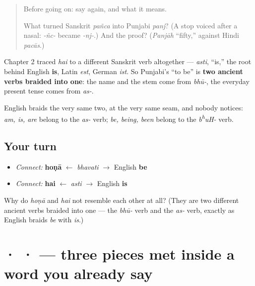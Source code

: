 \label{lesson:PA-C07-hona-two-roots}



\begin{quote}
Before going on: say \textbf{} again, and what it means.

What turned Sanskrit \emph{pañca} into Punjabi \emph{panj}? (A stop voiced after a nasal: \emph{-ñc-} became \emph{-nj-}.) And the proof? (\emph{Panjāh} \textquotedblleft{}fifty,\textquotedblright{} against Hindi \emph{pacās}.)
\end{quote}

\begin{grammarlens}[title={Grammar Lens: one verb, two roots}]
Chapter 2 traced \textbf{} \emph{hai} to a different Sanskrit verb altogether — \emph{asti}, “is,” the root behind English \textbf{is}, Latin \emph{est}, German \emph{ist}. So Punjabi's “to be” is \textbf{two ancient verbs braided into one}: the name and the stem come from \emph{bhū-}, the everyday present tense comes from \emph{as-}.

English braids the very same two, at the very same seam, and nobody notices: \emph{am, is, are} belong to the \emph{as-} verb; \emph{be, being, been} belong to the \emph{b\textsuperscript{h}uH-} verb.
\end{grammarlens}

\subsection*{Your turn}
\begin{itemize}
\raggedright
  \item \emph{Connect:} \textbf{hoṇā} $\leftarrow$ \emph{bhavati} $\to$ English \textbf{be}
  \item \emph{Connect:} \textbf{hai} $\leftarrow$ \emph{asti} $\to$ English \textbf{is}
\end{itemize}

\begin{tcolorbox}[breakable,colback=teal!4,colframe=teal!35!black,title={Before you move on}]
Why do \emph{hoṇā} and \emph{hai} not resemble each other at all? (They are two different ancient verbs braided into one — the \emph{bhū-} verb and the \emph{as-} verb, exactly as English braids \emph{be} with \emph{is}.)
\end{tcolorbox}
\section[\texorpdfstring{\pa{ਣ} · \pa{ਜ} · \pa{ਵ} (ṇa · ja · va)}{ਣ · ਜ · ਵ (ṇa · ja · va)}]{ ·  ·  — three pieces met inside a word you already say}

